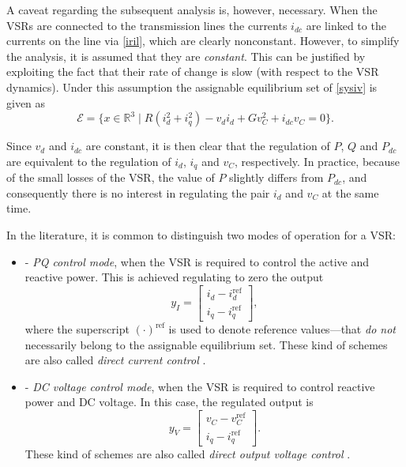 \documentclass[5p,twocolumn]{elsarticle}
\def\rea{\mathbb{R}}
\def\begite{\begin{itemize}}
\def\endite{\end{itemize}}
\def\lef[{\left[\begin{array}}
\def\rig]{\end{array}\right]}
\numberwithin{equation}{section}
\begin{document}
A caveat regarding the subsequent analysis is, however, necessary. When the VSRs are connected to the transmission lines the currents $i_{dc}$ are linked to the currents on the line via \eqref{iril}, which are clearly nonconstant. However, to simplify the analysis, it is assumed that they are {\em constant}. This can be justified by exploiting the fact that their rate of change is slow (with respect to the VSR dynamics).
Under this assumption the assignable equilibrium set of \eqref{sysiv} is given as
\begin{equation}
\label{equset}
{\mathcal{E}}=\{x \in \rea^3\;|\;R(i_d^2+i_q^2) - v_d i_d+G v_C^2 + i_{dc} v_C=0\}.
\end{equation}


Since $v_d$ and $i_{dc}$ are constant, it is then clear that the regulation of $P$, $Q$ and $P_{dc}$ are equivalent to the regulation of $i_d$, $i_q$ and $v_C$, respectively. In practice, because of the small
losses of the VSR, the value of $P$ slightly differs from $P_{dc}$, and consequently there is no interest in regulating the pair $i_d$ and $v_C$ at the same time.

In the literature, it is common to distinguish two modes of operation for a VSR:
\begite
\item[-] \textit{PQ control mode}, when the VSR is required to control the active and reactive power. This is achieved regulating to zero the output
\begin{equation}\label{DCC}
y_I=\lef[{c} i_d-i_d^{\mathrm{ref}}\\i_q-i_q^{\mathrm{ref}}\rig],
\end{equation}
where the superscript $(\cdot)^{\mathrm{ref}}$ is used to denote reference values---that {\em do not} necessarily  belong to the assignable equilibrium set. These kind of schemes are also called \textit{direct
current control} \cite{shuai}.

\item[-] \textit{DC voltage control mode}, when the VSR is required to control reactive power and DC voltage. In this case, the regulated output is
\begin{equation}\label{DOVC}
y_V=\lef[{c} v_C-v_C^{\mathrm{ref}}\\i_q-i_q^{\mathrm{ref}}\rig].
\end{equation}
These kind of schemes are also called \textit{direct
output voltage control} \cite{shuai}.
\endite
\end{document}
